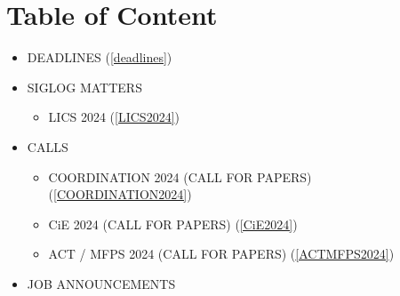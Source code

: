 \documentclass[prodmode,acmtecs]{acmsmall} %
\begin{document}
\section{Table of Content}\begin{itemize}\item DEADLINES (\cref{deadlines}) 
 
\item SIGLOG MATTERS 
 
\begin{itemize}\item LICS 2024 (\cref{LICS2024})
\end{itemize} 
\item CALLS 
 
\begin{itemize}\item COORDINATION 2024 (CALL FOR PAPERS) (\cref{COORDINATION2024})
\item CiE 2024 (CALL FOR PAPERS) (\cref{CiE2024})
\item ACT / MFPS 2024 (CALL FOR PAPERS) (\cref{ACTMFPS2024})
\end{itemize} 
\item JOB ANNOUNCEMENTS 
 

\end{itemize}
\end{document}

